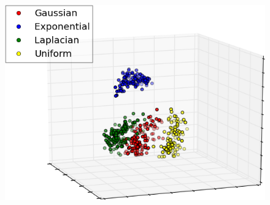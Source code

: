 \documentclass{article} %
\begin{document}
\begin{figure}
\centering
\begin{minipage}{0.4\textwidth}
\hspace{-2em}
\includegraphics[width=1\linewidth]{synthetic_dist.png}
\vspace{0.4em}
\end{minipage}


\end{figure}
\end{document}
